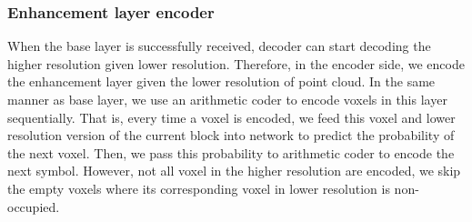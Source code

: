 \subsubsection{Enhancement layer encoder}
\par When the base layer is successfully received, decoder can start decoding the higher resolution given lower resolution. Therefore, in the encoder side, we encode the enhancement layer given the lower resolution of point cloud. In the same manner as base layer, we use an arithmetic coder to encode voxels in this layer sequentially. That is, every time a voxel is encoded, we feed this voxel and lower resolution version of the current block into network to predict the probability of the next voxel. Then, we pass this probability to arithmetic coder to encode the next symbol. However, not all voxel in the higher resolution are encoded, we skip the empty voxels where its corresponding voxel in lower resolution is non-occupied.